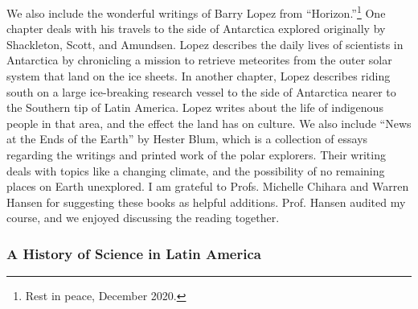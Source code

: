 \documentclass[../../../main.tex]{subfiles}
\begin{document}
We also include the wonderful writings of Barry Lopez from ``Horizon.''\footnote{Rest in peace, December 2020.}  One chapter deals with his travels to the side of Antarctica explored originally by Shackleton, Scott, and Amundsen.  Lopez describes the daily lives of scientists in Antarctica by chronicling a mission to retrieve meteorites from the outer solar system that land on the ice sheets.  In another chapter, Lopez describes riding south on a large ice-breaking research vessel to the side of Antarctica nearer to the Southern tip of Latin America.  Lopez writes about the life of indigenous people in that area, and the effect the land has on culture.  We also include ``News at the Ends of the Earth'' by Hester Blum, which is a collection of essays regarding the writings and printed work of the polar explorers.  Their writing deals with topics like a changing climate, and the possibility of no remaining places on Earth unexplored.  I am grateful to Profs. Michelle Chihara and Warren Hansen for suggesting these books as helpful additions.  Prof. Hansen audited my course, and we enjoyed discussing the reading together.

\subsubsection{A History of Science in Latin America}
\end{document}
